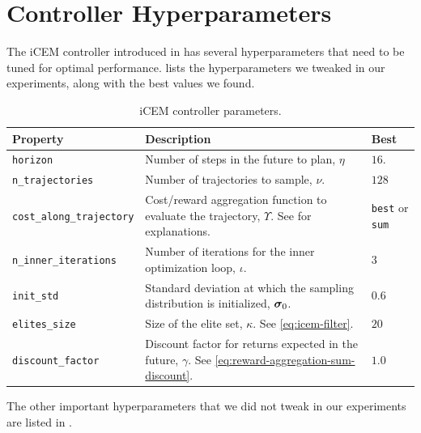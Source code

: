 \chapter{Controller Hyperparameters}
\label{sec:icem-details}
The iCEM controller introduced in  has several hyperparameters that need to be tuned for optimal performance.
 lists the hyperparameters we tweaked in our experiments, along with the best values we found.

\begin{table}[H]
    \centering
    \caption{iCEM controller parameters.}
    \begin{tabularx}{\textwidth}{C{4.7cm} L C{2cm}}
        \hline
        Property & Description & Best\\
        \hline
        \texttt{horizon} & Number of steps in the future to plan, \(\eta\) & \(16\).\\
        \texttt{n\_trajectories} & Number of trajectories to sample, \(\nu\). & \(128\)\\
        \texttt{cost\_along\_trajectory} & Cost/reward aggregation function to evaluate the trajectory, \(\mathit{\Upsilon}\). See  for explanations. & \texttt{best} or \texttt{sum}\\
        \texttt{n\_inner\_iterations} & Number of iterations for the inner optimization loop, \(\iota\). & \(3\)\\
        \texttt{init\_std} & Standard deviation at which the sampling distribution is initialized, \(\bm{\sigma}_0\). & \(0.6\)\\
        \texttt{elites\_size} & Size of the elite set, \(\kappa\). See \eqref{eq:icem-filter}. & \(20\)\\
        \texttt{discount\_factor} & Discount factor for returns expected in the future, \(\gamma\). See \eqref{eq:reward-aggregation-sum-discount}. & \(1.0\)\\ 
        \hline
    \end{tabularx}
    \label{tab:icem-params}
\end{table}

The other important hyperparameters that we did not tweak in our experiments are listed in .


